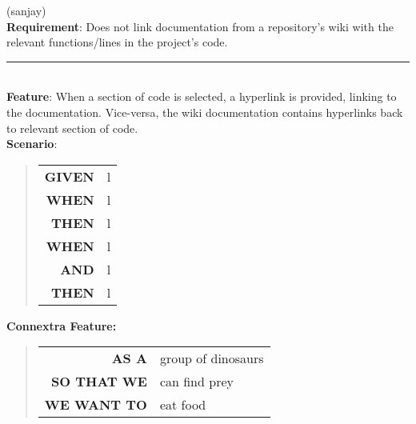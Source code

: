 \documentclass[12pt]{article}
\newcommand{\CFeature}[4]{
\noindent \textbf{Connextra Feature:}
	\begin{quote}
	\begin{tabular}{rl}
	\textbf{AS A} & #1\\
	\textbf{SO THAT \uppercase{#2}} & #3\\
	\textbf{\uppercase{#2} WANT TO} & #4  
	\end{tabular}
	\end{quote}
}
\begin{document}
\pagebreak
\begin{framed}
(sanjay)\\
\noindent \textbf{Requirement}: Does not link documentation from a repository's wiki with the relevant functions/lines in the project's code.\\[0.2cm]

\hrule~\\

\noindent \textbf{Feature}: When a section of code is selected, a hyperlink is provided, linking to the documentation. Vice-versa, the wiki documentation contains hyperlinks back to relevant section of code.\\[0.2cm]

\noindent \textbf{Scenario}:
\begin{quote}
\begin{tabular}{rl}
\textbf{GIVEN} & l\\
\textbf{WHEN} & l\\
\textbf{THEN} & l\\
\textbf{WHEN} & l\\
\textbf{AND} & l\\
\textbf{THEN} & l
\end{tabular}%
\end{quote}

\noindent \CFeature{group of dinosaurs}{we}{can find prey}{eat food}
\end{framed}
\end{document}
